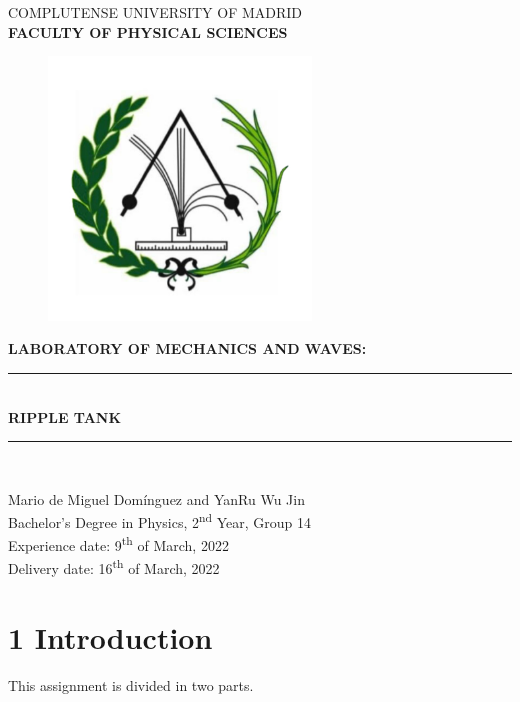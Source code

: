 \documentclass[a4paper, 12pt]{article}
\newcommand\blankpage{%
	\null
	\thispagestyle{empty}%
	\addtocounter{page}{-1}%
	\newpage}
\begin{document}
	\begin{titlepage}
		\centering
		\vfill
		\Large{COMPLUTENSE UNIVERSITY OF MADRID \\ \textbf{FACULTY OF PHYSICAL SCIENCES}}
		\vfill
		\begin{figure}[h!]
			\centering
			\includegraphics[height=7cm]{cumphysics}
		\end{figure}
		\vfill 
		\textbf{\Large{LABORATORY OF MECHANICS AND WAVES:}}
		\rule [5pt]{14cm}{2pt}\\
		\Huge{\textbf{RIPPLE TANK}} \\
		\rule [8pt]{14cm}{2pt}\\
		\vfill
		\vfill
		\vfill
		\vfill
		
		\large{Mario de Miguel Domínguez and YanRu Wu Jin\\ Bachelor's Degree in Physics, 2\textsuperscript{nd} Year, Group 14\\ Experience date: 9\textsuperscript{th} of March, 2022\\ Delivery date: 16\textsuperscript{th} of March, 2022}
		\vfill
		\vfill
		\vfill
		\vfill
		
		\afterpage{\blankpage}
	\end{titlepage}
	
	\makeatletter
	\thispagestyle{empty}
	\addtocounter{page}{-1}
	\let\latexl@section\l@section
	\def\l@section#1#2{\begingroup\let\numberline\@gobble\latexl@section{#1}{#2}\endgroup}
	\let\latexl@subsection\l@subsection
	\def\l@subsection#1#2{\begingroup\let\numberline\@gobble\latexl@subsection{#1}{#2}\endgroup}
	\let\latexl@subsubsection\l@subsubsection
	\def\l@subsubsection#1#2{\begingroup\let\numberline\@gobble\latexl@subsubsection{#1}{#2}\endgroup}
	\makeatother
	\tableofcontents	
	\thispagestyle{empty}
	\newpage
	
	\section{1 Introduction}
	This assignment is divided in two parts.\\
	
\end{document}
